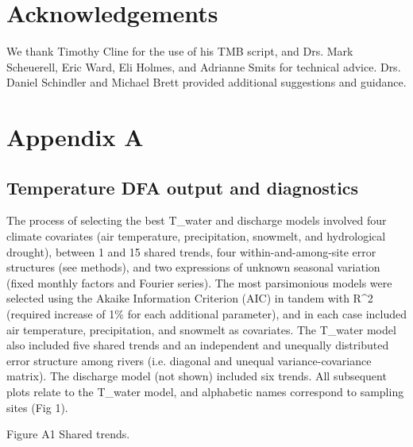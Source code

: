 \section*{Acknowledgements}
We thank Timothy Cline for the use of his TMB script, and Drs. Mark Scheuerell, Eric Ward, Eli Holmes, and Adrianne Smits for technical advice. Drs. Daniel Schindler and Michael Brett provided additional suggestions and guidance.

\section*{Appendix A}

\subsection*{Temperature DFA output and diagnostics}

The process of selecting the best T_water and discharge models involved four climate covariates (air temperature, precipitation, snowmelt, and hydrological drought), between 1 and 15 shared trends, four within-and-among-site error structures (see methods), and two expressions of unknown seasonal variation (fixed monthly factors and Fourier series). The most parsimonious models were selected using the Akaike Information Criterion (AIC) in tandem with R^2 (required increase of 1\% for each additional parameter), and in each case included air temperature, precipitation, and snowmelt as covariates. The T_water model also included five shared trends and an independent and unequally distributed error structure among rivers (i.e. diagonal and unequal variance-covariance matrix). The discharge model (not shown) included six trends. All subsequent plots relate to the T_water model, and alphabetic names correspond to sampling sites (Fig 1).

\begin{center}
\end{center}
Figure A1 Shared trends.

